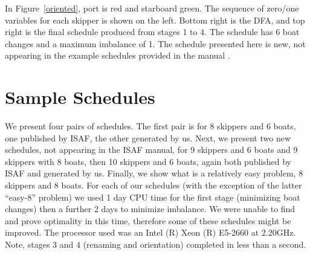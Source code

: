 \documentclass{llncs}
\begin{document}
In Figure~\ref{oriented}, port is red and starboard green. The sequence of zero/one variables for
each skipper is shown on the left. Bottom right is the DFA, and top right is the final schedule
produced from stages 1 to 4. The schedule has 6 boat changes and a maximum imbalance of 1. 
The schedule presented here is new, not appearing in the example schedules provided in the manual
\cite{isaf}.

\section{Sample Schedules}\label{sec:samples}
We present four pairs of schedules. The first pair is for 8 skippers and 6 boats, one published by
ISAF, the other generated by us. Next, we present two new schedules, not appearing in the ISAF
manual, for 9 skippers and 6 boats and 9 skippers with 8 boats, then 10 skippers and 6 boats, again
both published by ISAF and generated by us. Finally, we show what is a relatively easy problem, 8 skippers
and 8 boats.  For each of our schedules (with the exception of the latter ``easy-8'' problem) we used 1 day
CPU time for the first stage (minimizing boat changes) then a further 2 days to minimize imbalance. We were unable to find and prove optimality in this time, therefore some of 
these schedules might be improved. The processor used was an Intel (R) Xeon (R) E5-2660 at 2.20GHz. 
Note, stages 3 and 4 (renaming and orientation) completed in less than a second.
\end{document}
